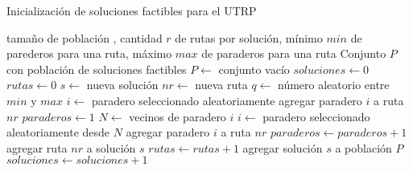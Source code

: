 \begin{algorithm}[!htb]
\caption{Inicialización de soluciones factibles para el UTRP}
\label{alg:inicializacion}
\begin{algorithmic}[1]
\REQUIRE tamaño de población \popsize, cantidad $r$ de rutas por solución, mínimo $min$ de parederos para una ruta, máximo $max$ de paraderos para una ruta
\ENSURE Conjunto $P$ con población de soluciones factibles
\STATE $P \leftarrow$ conjunto vacío
\STATE $soluciones \leftarrow 0$ 
	\STATE $rutas \leftarrow 0$
	\STATE $s \leftarrow$ nueva solución
		\STATE $nr \leftarrow$ nueva ruta
		\STATE $q \leftarrow$ número aleatorio entre $min$ y $max$
		\STATE $i \leftarrow$ paradero seleccionado aleatoriamente
		\STATE agregar paradero $i$ a ruta $nr$
		\STATE $paraderos \leftarrow 1$
			\STATE $N \leftarrow$ vecinos de paradero $i$
			\STATE $i \leftarrow$ paradero seleccionado aleatoriamente desde $N$
			\STATE agregar paradero $i$ a ruta $nr$			
			\STATE $paraderos \leftarrow paraderos+1$
		\ENDWHILE
		\STATE agregar ruta $nr$ a solución $s$
		\STATE $rutas \leftarrow rutas + 1$
	\ENDWHILE
	\STATE agregar solución $s$ a población $P$
	\STATE $soluciones \leftarrow soluciones+1$
\ENDWHILE
\end{algorithmic}
\end{algorithm}

